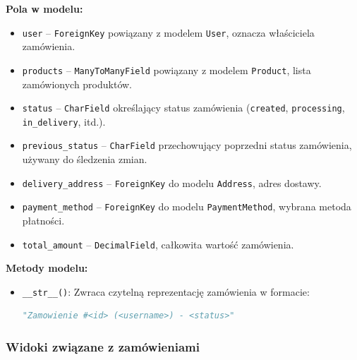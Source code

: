 \documentclass[12pt,a4paper,oneside]{article}
\theoremstyle{definition}
\numberwithin{equation}{section}
\begin{document}
\textbf{Pola w modelu:}
\begin{itemize}
    \item \texttt{user} – \texttt{ForeignKey} powiązany z modelem \texttt{User}, oznacza właściciela zamówienia.
    \item \texttt{products} – \texttt{ManyToManyField} powiązany z modelem \texttt{Product}, lista zamówionych produktów.
    \item \texttt{status} – \texttt{CharField} określający status zamówienia (\texttt{created}, \texttt{processing}, \texttt{in\_delivery}, itd.).
    \item \texttt{previous\_status} – \texttt{CharField} przechowujący poprzedni status zamówienia, używany do śledzenia zmian.
    \item \texttt{delivery\_address} – \texttt{ForeignKey} do modelu \texttt{Address}, adres dostawy.
    \item \texttt{payment\_method} – \texttt{ForeignKey} do modelu \texttt{PaymentMethod}, wybrana metoda płatności.
    \item \texttt{total\_amount} – \texttt{DecimalField}, całkowita wartość zamówienia.
\end{itemize}

\textbf{Metody modelu:}
\begin{itemize}
    \item \texttt{\_\_str\_\_()}: Zwraca czytelną reprezentację zamówienia w formacie:
    \begin{lstlisting}[language=Python]
"Zamowienie #<id> (<username>) - <status>"
    \end{lstlisting}
\end{itemize}

\subsubsection{Widoki związane z zamówieniami}
\end{document}
